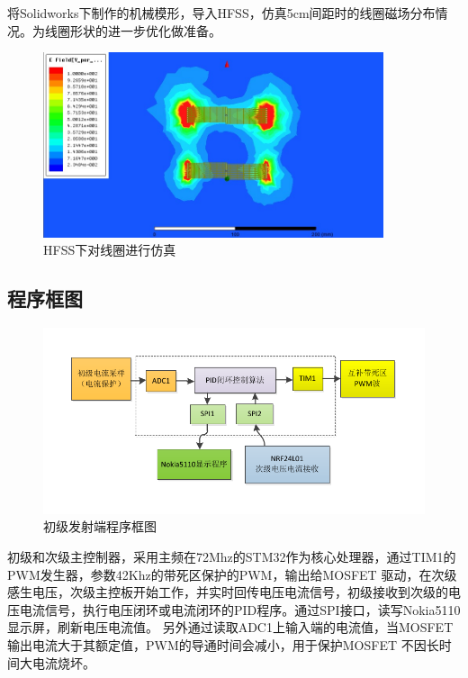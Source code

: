 ﻿\documentclass[UTF-8,a4paper,12pt]{ctexart}
\begin{document}
            将Solidworks下制作的机械模形，导入HFSS，仿真5cm间距时的线圈磁场分布情况。为线圈形状的进一步优化做准备。
            \begin{figure}[H]
              \centering
              \includegraphics[width=10cm]{HFSS.jpg}
              \caption{HFSS下对线圈进行仿真}
              \label{HFSS下对线圈进行仿真}
            \end{figure}       
                





    \subsection{程序框图}

            \begin{figure}[H]
              \centering
              \includegraphics[width=12cm]{pri.pdf}
              \caption{初级发射端程序框图}
              \label{frame_prim}
            \end{figure}
                初级和次级主控制器，采用主频在72Mhz的STM32作为核心处理器，通过TIM1的PWM发生器，参数42Khz的带死区保护的PWM，输出给MOSFET 驱动，在次级感生电压，次级主控板开始工作，并实时回传电压电流信号，初级接收到次级的电压电流信号，执行电压闭环或电流闭环的PID程序。通过SPI接口，读写Nokia5110显示屏，刷新电压电流值。
                另外通过读取ADC1上输入端的电流值，当MOSFET输出电流大于其额定值，PWM的导通时间会减小，用于保护MOSFET 不因长时间大电流烧坏。
\end{document}
